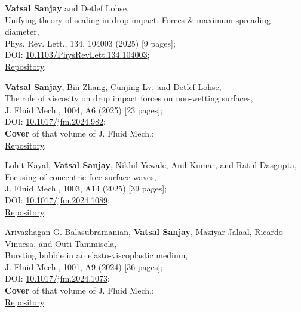 \documentclass[10pt,a4paper,colorlinks,linkcolor=blue,urlcolor=blue,citecolor=blue]{moderncv}
\begin{document}
\begin{enumerate}[leftmargin=1.5em,label=\textbf{[\arabic*]}]
	\item \textbf{Vatsal Sanjay} and Detlef Lohse,\\
	Unifying theory of scaling in drop impact: Forces \& maximum spreading diameter,\\
	Phys. Rev. Lett., 134, 104003 (2025) [9 pages];\\
	\faFile\hspace{0.2em}DOI: \href{https://doi.org/10.1103/PhysRevLett.134.104003}{10.1103/PhysRevLett.134.104003};\\
	\faGithub\hspace{0.2em}\href{https://github.com/comphy-lab/Drop-Impact}{Repository}.

	\item \textbf{Vatsal Sanjay}, Bin Zhang, Cunjing Lv, and Detlef Lohse,\\
	The role of viscosity on drop impact forces on non-wetting surfaces,\\
	J. Fluid Mech., 1004, A6 (2025) [23 pages];\\
	\faFile\hspace{0.2em}DOI: \href{https://doi.org/10.1017/jfm.2024.982}{10.1017/jfm.2024.982};\\
	\faStar\hspace{0.2em}\textbf{Cover} of that volume of J. Fluid Mech.;\\
	\faGithub\hspace{0.2em}\href{https://github.com/VatsalSy/The-role-of-viscosity-on-drop-impact-forces}{Repository}.

	\item Lohit Kayal, \textbf{Vatsal Sanjay}, Nikhil Yewale, Anil Kumar, and Ratul Dasgupta,\\
	Focusing of concentric free-surface waves,\\
	J. Fluid Mech., 1003, A14 (2025) [39 pages];\\
	\faFile\hspace{0.2em}DOI: \href{https://doi.org/10.1017/jfm.2024.1089}{10.1017/jfm.2024.1089};\\
	\faGithub\hspace{0.2em}\href{https://github.com/comphy-lab/concentricWave}{Repository}.

	\item Arivazhagan G. Balasubramanian, \textbf{Vatsal Sanjay}, Maziyar Jalaal, Ricardo Vinuesa, and Outi Tammisola,\\
	Bursting bubble in an elasto-viscoplastic medium,\\
	J. Fluid Mech., 1001, A9 (2024) [36 pages];\\
	\faFile\hspace{0.2em}DOI: \href{https://doi.org/10.1017/jfm.2024.1073}{10.1017/jfm.2024.1073};\\
	\faStar\hspace{0.2em}\textbf{Cover} of that volume of J. Fluid Mech.;\\
	\faGithub\hspace{0.2em}\href{https://github.com/comphy-lab/2023_Bubble-bursting-in-an-elasto-viscoplastic-medium}{Repository}.


\end{enumerate}
\end{document}
